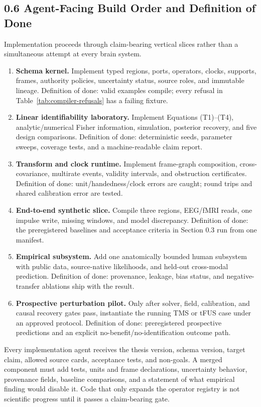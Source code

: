 \subsection{0.6 Agent-Facing Build Order and Definition of Done}

Implementation proceeds through claim-bearing vertical slices rather than a
simultaneous attempt at every brain system.

\begin{enumerate}
\item \textbf{Schema kernel.} Implement typed regions, ports, operators,
  clocks, supports, frames, authority policies, uncertainty status, source
  roles, and immutable lineage. Definition of done: valid examples compile;
  every refusal in Table~\ref{tab:compiler-refusals} has a failing fixture.
\item \textbf{Linear identifiability laboratory.} Implement Equations
  (T1)--(T4), analytic/numerical Fisher information, simulation, posterior
  recovery, and five design comparisons. Definition of done: deterministic
  seeds, parameter sweeps, coverage tests, and a machine-readable claim report.
\item \textbf{Transform and clock runtime.} Implement frame-graph composition,
  cross-covariance, multirate events, validity intervals, and obstruction
  certificates. Definition of done: unit/handedness/clock errors are caught;
  round trips and shared calibration error are tested.
\item \textbf{End-to-end synthetic slice.} Compile three regions, EEG/fMRI
  reads, one impulse write, missing windows, and model discrepancy. Definition
  of done: the preregistered baselines and acceptance criteria in Section 0.3
  run from one manifest.
\item \textbf{Empirical subsystem.} Add one anatomically bounded human
  subsystem with public data, source-native likelihoods, and held-out
  cross-modal prediction. Definition of done: provenance, leakage, bias status,
  and negative-transfer ablations ship with the result.
\item \textbf{Prospective perturbation pilot.} Only after solver, field,
  calibration, and causal recovery gates pass, instantiate the running TMS or
  tFUS case under an approved protocol. Definition of done: preregistered
  prospective predictions and an explicit no-benefit/no-identification outcome
  path.
\end{enumerate}

Every implementation agent receives the thesis version, schema version,
target claim, allowed source cards, acceptance tests, and non-goals. A merged
component must add tests, units and frame declarations, uncertainty behavior,
provenance fields, baseline comparisons, and a statement of what empirical
finding would disable it. Code that only expands the operator registry is not
scientific progress until it passes a claim-bearing gate.
